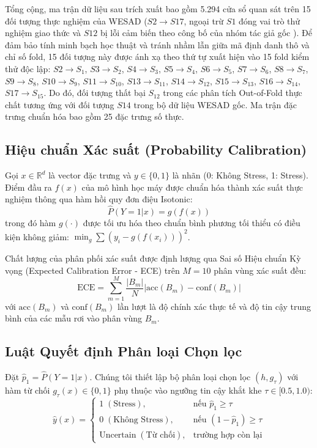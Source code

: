 \documentclass[conference]{IEEEtran}
\begin{document}
Tổng cộng, ma trận dữ liệu sau trích xuất bao gồm 5.294 cửa sổ quan sát trên 15 đối tượng thực nghiệm của WESAD ($S2 \rightarrow S17$, ngoại trừ $S1$ đóng vai trò thử nghiệm giao thức và $S12$ bị lỗi cảm biến theo công bố của nhóm tác giả gốc \cite{schmidt2018wesad}). Để đảm bảo tính minh bạch học thuật và tránh nhầm lẫn giữa mã định danh thô và chỉ số fold, 15 đối tượng này được ánh xạ theo thứ tự xuất hiện vào 15 fold kiểm thử độc lập: $S2 \rightarrow S_1$, $S3 \rightarrow S_2$, $S4 \rightarrow S_3$, $S5 \rightarrow S_4$, $S6 \rightarrow S_5$, $S7 \rightarrow S_6$, $S8 \rightarrow S_7$, $S9 \rightarrow S_8$, $S10 \rightarrow S_9$, $S11 \rightarrow S_{10}$, $S13 \rightarrow S_{11}$, $S14 \rightarrow S_{12}$, $S15 \rightarrow S_{13}$, $S16 \rightarrow S_{14}$, $S17 \rightarrow S_{15}$. Do đó, đối tượng thất bại $S_{12}$ trong các phân tích Out-of-Fold thực chất tương ứng với đối tượng $S14$ trong bộ dữ liệu WESAD gốc. Ma trận đặc trưng chuẩn hóa bao gồm 25 đặc trưng số thực.

\subsection{Hiệu chuẩn Xác suất (Probability Calibration)}
Gọi $x \in \mathbb{R}^d$ là vector đặc trưng và $y \in \{0, 1\}$ là nhãn (0: Không Stress, 1: Stress). Điểm đầu ra $f(x)$ của mô hình học máy được chuẩn hóa thành xác suất thực nghiệm thông qua hàm hồi quy đơn điệu Isotonic:
\begin{equation}
\hat{P}(Y=1|x) = g(f(x))
\end{equation}
trong đó hàm $g(\cdot)$ được tối ưu hóa theo chuẩn bình phương tối thiểu có điều kiện không giảm: $\min_g \sum (y_i - g(f(x_i)))^2$.

Chất lượng của phân phối xác suất được định lượng qua Sai số Hiệu chuẩn Kỳ vọng (Expected Calibration Error - ECE) trên $M=10$ phân vùng xác suất đều:
\begin{equation}
\text{ECE} = \sum_{m=1}^M \frac{|B_m|}{N} \left| \text{acc}(B_m) - \text{conf}(B_m) \right|
\end{equation}
với $\text{acc}(B_m)$ và $\text{conf}(B_m)$ lần lượt là độ chính xác thực tế và độ tin cậy trung bình của các mẫu rơi vào phân vùng $B_m$.

\subsection{Luật Quyết định Phân loại Chọn lọc}
Đặt $\hat{p}_1 = \hat{P}(Y=1|x)$. Chúng tôi thiết lập bộ phân loại chọn lọc $(h, g_\tau)$ với hàm từ chối $g_\tau(x) \in \{0, 1\}$ phụ thuộc vào ngưỡng tin cậy khắt khe $\tau \in [0.5, 1.0)$:
\begin{equation}
\hat{y}(x) = 
\begin{cases} 
1 \; (\text{Stress}), & \text{nếu } \hat{p}_1 \ge \tau \\
0 \; (\text{Không Stress}), & \text{nếu } (1 - \hat{p}_1) \ge \tau \\
\text{Uncertain} \; (\text{Từ chối}), & \text{trường hợp còn lại}
\end{cases}
\end{equation}
\end{document}

